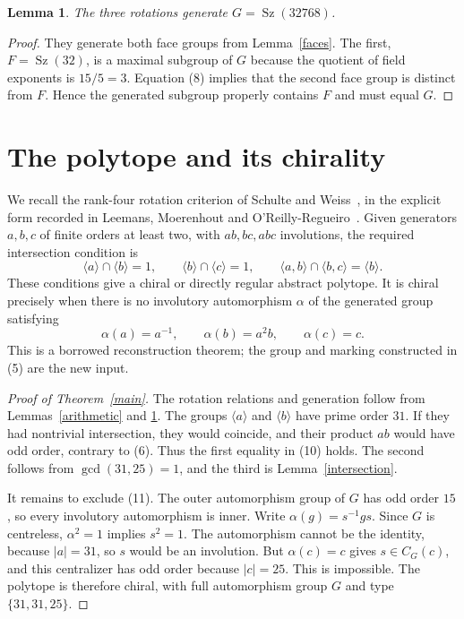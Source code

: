 \documentclass[11pt,a4paper]{article}
\newtheorem{lemma}[theorem]{Lemma}
\newcommand{\Sz}{\operatorname{Sz}}
\newcommand{\gen}[1]{\langle#1\rangle}
\begin{document}
\begin{lemma}\label{generation}
The three rotations generate $G=\Sz(32768)$.
\end{lemma}
\begin{proof}
They generate both face groups from Lemma~\ref{faces}. The first,
$F=\Sz(32)$, is a maximal subgroup of $G$ because the quotient of
field exponents is $15/5=3$. Equation (8) implies that the second
face group is distinct from $F$. Hence the generated subgroup
properly contains $F$ and must equal $G$.
\end{proof}

\section{The polytope and its chirality}
We recall the rank-four rotation criterion of Schulte and
Weiss~\cite{SW}, in the explicit form recorded in
Leemans, Moerenhout and O'Reilly-Regueiro~\cite[\S2, (C3$'$)]{LMO}.
Given generators $a,b,c$ of finite orders at least two, with
$ab,bc,abc$ involutions, the required intersection condition is
\[
 \gen a\cap\gen b=1,\qquad
 \gen b\cap\gen c=1,\qquad
 \gen{a,b}\cap\gen{b,c}=\gen b.
 \tag{10}
\]
These conditions give a chiral or directly regular abstract polytope.
It is chiral precisely when there is no involutory automorphism
$\alpha$ of the generated group satisfying
\[
 \alpha(a)=a^{-1},\qquad \alpha(b)=a^2b,
 \qquad\alpha(c)=c.
 \tag{11}
\]
This is a borrowed reconstruction theorem; the group and marking
constructed in (5) are the new input.

\begin{proof}[Proof of Theorem~\ref{main}]
The rotation relations and generation follow from
Lemmas~\ref{arithmetic} and \ref{generation}. The groups $\gen a$
and $\gen b$ have prime order $31$. If they had nontrivial
intersection, they would coincide, and their product $ab$ would
have odd order, contrary to (6). Thus the first equality in (10)
holds. The second follows from $\gcd(31,25)=1$, and the third is
Lemma~\ref{intersection}.

It remains to exclude (11). The outer automorphism group of $G$ has
odd order $15$, so every involutory automorphism is inner. Write
$\alpha(g)=s^{-1}gs$. Since $G$ is centreless, $\alpha^2=1$
implies $s^2=1$. The automorphism cannot be the identity, because
$|a|=31$, so $s$ would be an involution. But $\alpha(c)=c$ gives
$s\in C_G(c)$, and this centralizer has odd order because $|c|=25$.
This is impossible. The polytope is therefore chiral, with full
automorphism group $G$ and type $\{31,31,25\}$.
\end{proof}
\end{document}
